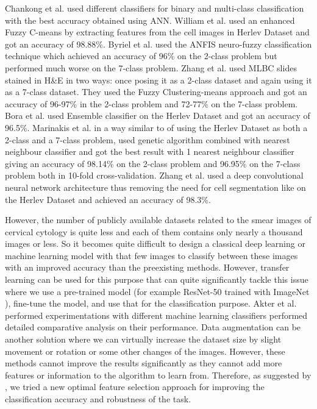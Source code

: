 \documentclass{llncs}
\begin{document}
Chankong et al. \cite{chankong2014automatic} used different classifiers for binary and multi-class classification with the best accuracy obtained using ANN. William et al. \cite{william2019pap} used an enhanced Fuzzy C-means by extracting features from the cell images in Herlev Dataset and got an accuracy of 98.88\%. Byriel et al. \cite{byriel1999neuro} used the ANFIS neuro-fuzzy classification technique which achieved an accuracy of 96\% on the 2-class problem but performed much worse on the 7-class problem. Zhang et al. \cite{zhang2014automation} used MLBC slides stained in H\&E in two ways: once posing it as a 2-class dataset and again using it as a 7-class dataset. They used the Fuzzy Clustering-means approach and got an accuracy of 96-97\% in the 2-class problem and 72-77\% on the 7-class problem. Bora et al. \cite{bora2017automated} used Ensemble classifier on the Herlev Dataset and got an accuracy of 96.5\%. Marinakis et al. \cite{marinakis2009pap} in a way similar to \cite{zhang2014automation, xue2020application} of using the Herlev Dataset as both a 2-class and a 7-class problem, used genetic algorithm combined with nearest neighbour classifier and got the best result with 1 nearest neighbour classifier giving an accuracy of 98.14\% on the 2-class problem and 96.95\% on the 7-class problem both in 10-fold cross-validation. Zhang et al. \cite{zhang2017deeppap} used a deep convolutional neural network architecture thus removing the need for cell segmentation like \cite{huang2020nucleus, chattopadhyay2020multi} on the Herlev Dataset and achieved an accuracy of 98.3\%.

However, the number of publicly available datasets related to the smear images of cervical cytology is quite less and each of them contains only nearly a thousand images or less. So it becomes quite difficult to design a classical deep learning or machine learning model with that few images to classify between these images with an improved accuracy than the preexisting methods. However, transfer learning can be used for this purpose that can quite significantly tackle this issue where we use a pre-trained model (for example ResNet-50 trained with ImageNet \cite{deng2009imagenet}), fine-tune the model, and use that for the classification purpose. Akter et al. \cite{akter2021prediction} performed experimentations with different machine learning classifiers performed detailed comparative analysis on their performance. Data augmentation can be another solution where we can virtually increase the dataset size by slight movement or rotation or some other changes of the images. However, these methods cannot improve the results significantly as they cannot add more features or information to the algorithm to learn from. Therefore, as suggested by \cite{niedzielewski2020multidimensional}, we tried a new optimal feature selection approach for improving the classification accuracy and robustness of the task.
\end{document}
